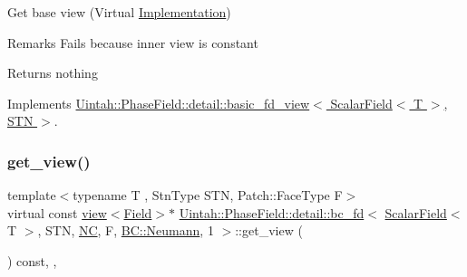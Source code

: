 Get base view (Virtual \hyperlink{classUintah_1_1PhaseField_1_1Implementation}{Implementation}) 

\begin{DoxyRemark}{Remarks}
Fails because inner view is constant
\end{DoxyRemark}
\begin{DoxyReturn}{Returns}
nothing 
\end{DoxyReturn}


Implements \hyperlink{classUintah_1_1PhaseField_1_1detail_1_1basic__fd__view_3_01ScalarField_3_01T_01_4_00_01STN_01_4_a2bbf870b332cfd997ec5297428019bc8}{Uintah\+::\+Phase\+Field\+::detail\+::basic\+\_\+fd\+\_\+view$<$ Scalar\+Field$<$ T $>$, S\+T\+N $>$}.

\mbox{\label{classUintah_1_1PhaseField_1_1detail_1_1bc__fd_3_01ScalarField_3_01T_01_4_00_01STN_00_01NC_00_01F_00_01BC_1_1Neumann_00_011_01_4_a54dca99f90e96dabfffe594538bd5ca8}} 
\subsubsection{\texorpdfstring{get\+\_\+view()}{get\_view()}\hspace{0.1cm}{\footnotesize\ttfamily [2/2]}}
{\footnotesize\ttfamily template$<$typename T , Stn\+Type S\+TN, Patch\+::\+Face\+Type F$>$ \\
virtual const \hyperlink{classUintah_1_1PhaseField_1_1detail_1_1view}{view}$<$\hyperlink{structUintah_1_1PhaseField_1_1ScalarField}{Field}$>$$\ast$ \hyperlink{classUintah_1_1PhaseField_1_1detail_1_1bc__fd}{Uintah\+::\+Phase\+Field\+::detail\+::bc\+\_\+fd}$<$ \hyperlink{structUintah_1_1PhaseField_1_1ScalarField}{Scalar\+Field}$<$ T $>$, S\+TN, \hyperlink{namespaceUintah_1_1PhaseField_a33d355affda78a83f45755ba8388cedda77924170fe82bfd58b74ca3e44139718}{NC}, F, \hyperlink{namespaceUintah_1_1PhaseField_a148fba372aa3be96fd6eede7a2fa10b5ab8537a769dbc90cb1762215441212152}{B\+C\+::\+Neumann}, 1 $>$\+::get\+\_\+view (\begin{DoxyParamCaption}{ }\end{DoxyParamCaption}) const\hspace{0.3cm}{\ttfamily [inline]}, {\ttfamily [override]}, {\ttfamily [virtual]}}



